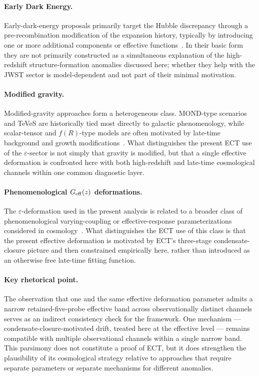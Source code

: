 \paragraph{Early Dark Energy.}
Early-dark-energy proposals primarily target the Hubble discrepancy
through a pre-recombination modification of the expansion history,
typically by introducing one or more additional components or
effective functions~\cite{Poulin2019}. In their basic form they are
not primarily constructed as a simultaneous explanation of the
high-redshift structure-formation anomalies discussed here; whether
they help with the JWST sector is model-dependent and not part of
their minimal motivation.

\paragraph{Modified gravity.}
Modified-gravity approaches form a heterogeneous class. MOND-type
scenarios and TeVeS are historically tied most directly to galactic
phenomenology, while scalar-tensor and $f(R)$-type models are often
motivated by late-time background and growth
modifications~\cite{Milgrom1983,Sotiriou2010}. What distinguishes the
present ECT use of the $\varepsilon$-sector is not simply that gravity
is modified, but that a single effective deformation is confronted
here with both high-redshift and late-time cosmological channels
within one common diagnostic layer.

\paragraph{Phenomenological $G_{\rm eff}(z)$ deformations.}
The $\varepsilon$-deformation used in the present analysis is related
to a broader class of phenomenological varying-coupling or
effective-response parameterizations considered in
cosmology~\cite{Uzan2011}. What distinguishes the ECT use of this
class is that the present effective deformation is motivated by ECT's
three-stage condensate-closure picture and then constrained
empirically here, rather than introduced as an otherwise free
late-time fitting function.

\paragraph{Key rhetorical point.}
The observation that one and the same effective deformation parameter
admits a narrow retained-five-probe effective band across
observationally distinct channels serves as an indirect consistency
check for the framework. One mechanism --- condensate-closure-motivated
drift, treated here at the effective level --- remains compatible
with multiple observational channels within a single narrow band.
This parsimony does not constitute a proof of ECT, but it does
strengthen the plausibility of its cosmological strategy relative to
approaches that require separate parameters or separate mechanisms
for different anomalies.


